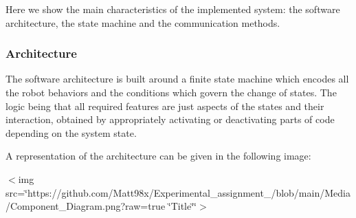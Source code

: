 Here we show the main characteristics of the implemented system\+: the software architecture, the state machine and the communication methods.

\subsubsection*{Architecture}

The software architecture is built around a finite state machine which encodes all the robot behaviors and the conditions which govern the change of states. The logic being that all required features are just aspects of the states and their interaction, obtained by appropriately activating or deactivating parts of code depending on the system state.

A representation of the architecture can be given in the following image\+: 

$<$img src=\char`\"{}https\+://github.\+com/\+Matt98x/\+Experimental\+\_\+assignment\+\_/blob/main/\+Media/\+Component\+\_\+\+Diagram.\+png?raw=true \char`\"{}Title\char`\"{}\char`\"{}$>$ 

